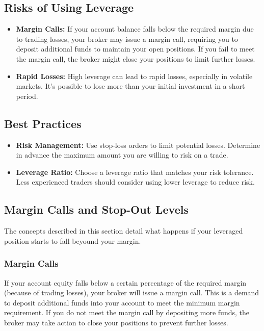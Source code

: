 \documentclass{report}
\begin{document}
     \bigbreak \noindent 
     \subsection{Risks of Using Leverage}
     \begin{itemize}
         \item \textbf{Margin Calls:} If your account balance falls below the required margin due to trading losses, your broker may issue a margin call, requiring you to deposit additional funds to maintain your open positions. If you fail to meet the margin call, the broker might close your positions to limit further losses.
         \item \textbf{Rapid Losses:} High leverage can lead to rapid losses, especially in volatile markets. It's possible to lose more than your initial investment in a short period.
     \end{itemize}

     \bigbreak \noindent 
     \subsection{Best Practices}
     \begin{itemize}
         \item \textbf{Risk Management:} Use stop-loss orders to limit potential losses. Determine in advance the maximum amount you are willing to risk on a trade.
         \item \textbf{Leverage Ratio:} Choose a leverage ratio that matches your risk tolerance. Less experienced traders should consider using lower leverage to reduce risk.
     \end{itemize}

     \bigbreak \noindent 
     \subsection{Margin Calls and Stop-Out Levels}
     \bigbreak \noindent 
     The concepts described in this section detail what happens if your leveraged position starts to fall beyound your margin.
     \bigbreak \noindent 
     \subsubsection{Margin Calls}
     \bigbreak \noindent 
     If your account equity falls below a certain percentage of the required margin (because of trading losses), your broker will issue a margin call. This is a demand to deposit additional funds into your account to meet the minimum margin requirement. If you do not meet the margin call by depositing more funds, the broker may take action to close your positions to prevent further losses.
\end{document}

